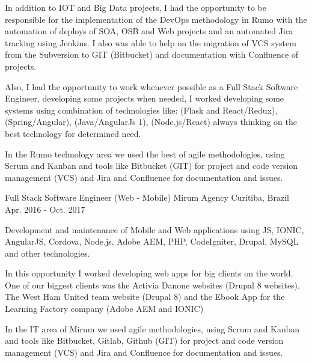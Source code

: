 \begin{cventries}
{\begin{cvitems}
          \item {In addition to IOT and Big Data projects, I had the opportunity to be responsible for the implementation of the DevOps methodology in Rumo with the automation of deploys of SOA, OSB and Web projects and an automated Jira tracking using Jenkins. I also was able to help on the migration of VCS system from the Subversion to GIT (Bitbucket) and documentation with Confluence of projects.}
          \item {Also, I had the opportunity to work whenever possible as a Full Stack Software Engineer, developing some projects when needed, I worked developing some systems using combination of technologies like: (Flask and React/Redux), (Spring/Angular), (Java/AngularJs 1), (Node.js/React) always thinking on the best technology for determined need.}
        \item {In the Rumo technology area we used the best of agile methodologies, using Scrum and Kanban and tools like Bitbucket (GIT) for project and code version management (VCS) and Jira and Confluence for documentation and issues.}
      \end{cvitems}
    }
  \cventry
    {Full Stack Software Engineer (Web - Mobile)} %
    {Mirum Agency} %
    {Curitiba, Brazil} %
    {Apr. 2016 - Oct. 2017} %
    {
      \begin{cvitems} %
        \item {Development and maintenance of Mobile and Web applications using JS, IONIC, AngularJS, Cordova, Node.js, Adobe AEM, PHP, CodeIgniter, Drupal, MySQL and other technologies.}
        \item {In this opportunity I worked developing web apps for big clients on the world. One of our biggest clients was the Activia Danone websites (Drupal 8 websites), The West Ham United team website (Drupal 8) and the Ebook App for the Learning Factory company (Adobe AEM and IONIC) }
\item {In the IT area of Mirum we used agile methodologies, using Scrum and Kanban and tools like Bitbucket, Gitlab, Github (GIT) for project and code version management (VCS) and Jira and Confluence for documentation and issues.}
\end{cvitems}
    }


\end{cventries}
